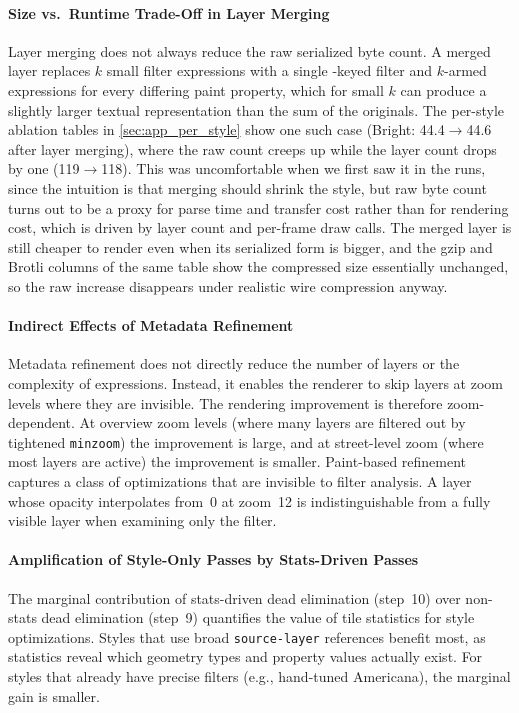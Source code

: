 \paragraph{Size vs.\ Runtime Trade-Off in Layer Merging}
Layer merging does not always reduce the raw serialized byte count.
A merged layer replaces $k$ small filter expressions with a single -keyed filter and $k$-armed  expressions for every differing paint property, which for small $k$ can produce a slightly larger textual representation than the sum of the originals.
The per-style ablation tables in \cref{sec:app_per_style} show one such case (Bright: \num{44.4}$\to$\qty{44.6}{\kilo\byte} after layer merging), where the raw count creeps up while the layer count drops by one (119$\to$118).
This was uncomfortable when we first saw it in the runs, since the intuition is that merging should shrink the style, but raw byte count turns out to be a proxy for parse time and transfer cost rather than for rendering cost, which is driven by layer count and per-frame draw calls.
The merged layer is still cheaper to render even when its serialized form is bigger, and the gzip and Brotli columns of the same table show the compressed size essentially unchanged, so the raw increase disappears under realistic wire compression anyway.

\paragraph{Indirect Effects of Metadata Refinement}
Metadata refinement does not directly reduce the number of layers or the complexity of expressions.
Instead, it enables the renderer to skip layers at zoom levels where they are invisible.
The rendering improvement is therefore zoom-dependent.
At overview zoom levels (where many layers are filtered out by tightened \texttt{minzoom}) the improvement is large, and at street-level zoom (where most layers are active) the improvement is smaller.
Paint-based refinement captures a class of optimizations that are invisible to filter analysis.
A layer whose opacity interpolates from~0 at zoom~12 is indistinguishable from a fully visible layer when examining only the filter.

\paragraph{Amplification of Style-Only Passes by Stats-Driven Passes}
The marginal contribution of stats-driven dead elimination (step~10) over non-stats dead elimination (step~9) quantifies the value of tile statistics for style optimizations.
Styles that use broad \texttt{source-layer} references benefit most, as statistics reveal which geometry types and property values actually exist.
For styles that already have precise filters (e.g., hand-tuned Americana), the marginal gain is smaller.

